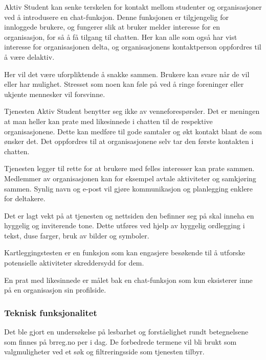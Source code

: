 Aktiv Student kan senke terskelen for kontakt mellom studenter og organisasjoner ved å introdusere en chat-funksjon. Denne funksjonen er tilgjengelig for innloggede brukere, og fungerer slik at bruker melder interesse for en organisasjon, for så å få tilgang til chatten. Her kan alle som også har vist interesse for organisasjonen delta, og organisasjonens kontaktperson oppfordres til å være delaktiv.

Her vil det være uforpliktende å snakke sammen. Brukere kan svare når de vil eller har mulighet. Stresset som noen kan føle på ved å ringe foreninger eller ukjente mennesker vil forsvinne.

Tjenesten Aktiv Student benytter seg ikke av venneforespørsler. Det er meningen at man heller kan prate med likesinnede i chatten til de respektive organisasjonene. Dette kan medføre til gode samtaler og økt kontakt blant de som ønsker det. Det oppfordres til at organisasjonene selv tar den første kontakten i chatten.

Tjenesten legger til rette for at brukere med felles interesser kan prate sammen. Medlemmer av organisasjonen kan for eksempel avtale aktiviteter og samkjøring sammen. Synlig navn og e-post vil gjøre kommunikasjon og planlegging enklere for deltakere.


Det er lagt vekt på at tjenesten og nettsiden den befinner seg på skal inneha en hyggelig og inviterende tone. Dette utføres ved hjelp av hyggelig ordlegging i tekst, duse farger, bruk av bilder og symboler.

Kartleggingstesten er en funksjon som kan engasjere besøkende til å utforske potensielle aktiviteter skreddersydd for dem.

En prat med likesinnede er målet bak en chat-funksjon som kun eksisterer inne på en organisasjon sin profilside.

\subsubsection{Teknisk funksjonalitet}
Det ble gjort en undersøkelse på lesbarhet og forståelighet rundt betegnelsene som finnes på brreg.no per i dag. De forbedrede termene vil bli brukt som valgmuligheter ved et søk og filtreringsside som tjenesten tilbyr.

